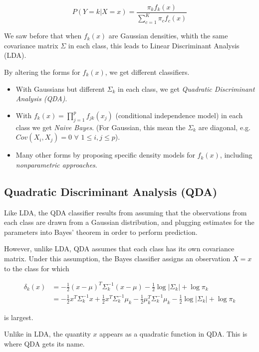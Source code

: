 \documentclass[]{book}
\providecommand{\tightlist}{%
  \setlength{\itemsep}{0pt}\setlength{\parskip}{0pt}}
\begin{document}
\[P(Y=k|X=x) = \frac{ \pi_k f_k(x)}{\sum_{c=1}^K \pi_c f_c(x)}\]

We saw before that when \(f_k(x)\) are Gaussian densities, whith the
same covariance matrix \(\Sigma\) in each class, this leads to Linear
Discriminant Analysis (LDA).

By altering the forms for \(f_k(x)\), we get different classifiers.

\begin{itemize}
\tightlist
\item
  With Gaussians but different \(\Sigma_k\) in each class, we get
  \emph{Quadratic Discriminant Analysis (QDA)}.
\item
  With \(f_k(x) = \prod_{j=1}^p f_{jk}(x_j)\) (conditional independence
  model) in each class we get \emph{Naive Bayes}. (For Gaussian, this
  mean the \(\Sigma_k\) are diagonal, e.g.
  \(Cov(X_i,X_j)=0 \,\, \forall \, \, 1\leq i,j \leq p\)).
\item
  Many other forms by proposing specific density models for \(f_k(x)\),
  including \emph{nonparametric approaches}.
\end{itemize}

\subsection{Quadratic Discriminant Analysis
(QDA)}\label{quadratic-discriminant-analysis-qda}

Like LDA, the QDA classiﬁer results from assuming that the observations
from each class are drawn from a Gaussian distribution, and plugging
estimates for the parameters into Bayes' theorem in order to perform
prediction.

However, unlike LDA, QDA assumes that each class has its own covariance
matrix. Under this assumption, the Bayes classiﬁer assigns an
observation \(X = x\) to the class for which

\begin{align*}
\delta_k(x) &= - \frac{1}{2} (x-\mu)^T \Sigma_k^{-1} (x-\mu) - \frac{1}{2} \log |\Sigma_k| + \log \pi_k \\
            &= - \frac{1}{2} x^T \Sigma_k^{-1} x + \frac{1}{2} x^T \Sigma_k^{-1} \mu_k - \frac{1}{2} \mu_k^T \Sigma_k^{-1} \mu_k - \frac{1}{2} \log |\Sigma_k| + \log \pi_k
\end{align*}

is largest.

Unlike in LDA, the quantity \(x\) appears as a quadratic function in
QDA. This is where QDA gets its name.
\end{document}
